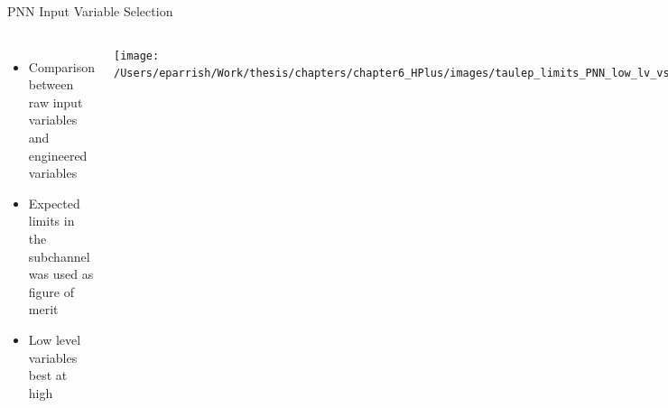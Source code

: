 \documentclass[aspectratio=169,xcolor=table]{beamer}
\begin{document}
\begin{frame}[t]{PNN Input Variable Selection}
\begin{columns}
        \centering
        \begin{table}[!thp]
      \end{table}

    \begin{itemize}
      \item Comparison between raw input variables and engineered variables
      \item Expected limits in the \taulep subchannel was used as figure of merit
      \item Low level variables best at high \mHpm
    \end{itemize}
    \centering
    \texttt{[image: /Users/eparrish/Work/thesis/chapters/chapter6\_HPlus/images/taulep\_limits\_PNN\_low\_lv\_vs\_high\_lv.eps]}

    \end{columns}
    \end{frame}
\end{document}
